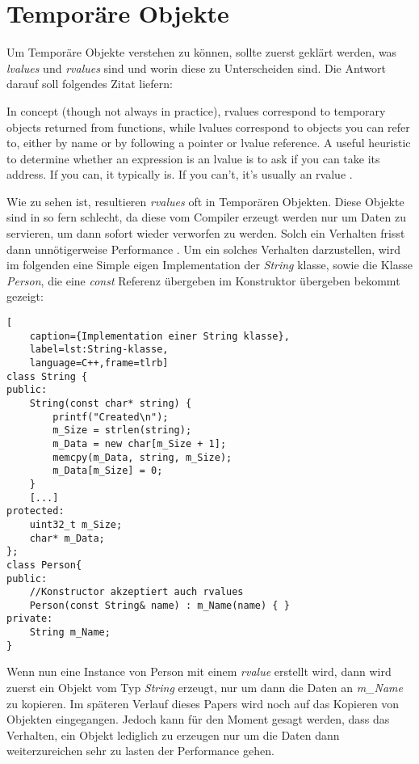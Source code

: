 \section{Temporäre Objekte}\label{sec:tempobj}
Um Temporäre Objekte verstehen zu können, sollte zuerst geklärt werden, was \emph{lvalues} und
\emph{rvalues} sind und worin diese zu Unterscheiden sind. Die Antwort darauf soll folgendes
Zitat liefern:
\begin{zitat}
	In concept (though not always in practice), rvalues correspond to temporary
	objects returned from functions, while lvalues correspond to objects you can refer to, either by
	name or by following a pointer or lvalue reference. A useful heuristic to determine whether an
	expression is an lvalue is to ask if you can take its address. If you can, it typically is. If
	you can’t, it’s usually an rvalue \cite{EffectiveC++}.
\end{zitat}
Wie zu sehen ist, resultieren \emph{rvalues} oft in Temporären Objekten. Diese Objekte sind in so
fern schlecht, da diese vom Compiler erzeugt werden nur um Daten zu servieren, um dann sofort
wieder verworfen zu werden. Solch ein Verhalten frisst dann unnötigerweise Performance
.\cite{HandsOn}
\newline
\newline
Um ein solches Verhalten darzustellen, wird im folgenden eine Simple eigen Implementation der
\emph{String} klasse, sowie die Klasse \emph{Person}, die eine \emph{const} Referenz übergeben im
Konstruktor übergeben bekommt gezeigt:

\begin{lstlisting}[
    caption={Implementation einer String klasse},
    label=lst:String-klasse,
    language=C++,frame=tlrb]
class String {
public:
	String(const char* string) {
		printf("Created\n");
		m_Size = strlen(string);
		m_Data = new char[m_Size + 1];
		memcpy(m_Data, string, m_Size);
		m_Data[m_Size] = 0;
	}
	[...]
protected:
    uint32_t m_Size;
    char* m_Data;
};
class Person{
public:
	//Konstructor akzeptiert auch rvalues
	Person(const String& name) : m_Name(name) { }
private:
	String m_Name;
}
\end{lstlisting}

Wenn nun eine Instance von Person mit einem \emph{rvalue} erstellt wird, dann wird zuerst ein
Objekt vom Typ \emph{String} erzeugt, nur um dann die Daten an \emph{m\_Name} zu kopieren. Im
späteren Verlauf dieses Papers wird noch auf das Kopieren von Objekten eingegangen. Jedoch kann
für den Moment gesagt werden, dass das Verhalten, ein Objekt lediglich zu erzeugen nur um die
Daten dann weiterzureichen sehr zu lasten der Performance gehen.